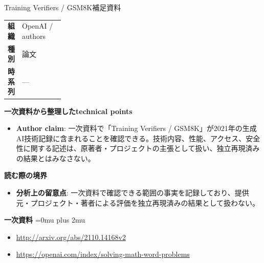 \begin{technicalnote}{Training Verifiers / GSM8K}{補足資料}
\begingroup
\begin{tabularx}{\linewidth}{@{}>{\bfseries}p{0.22\linewidth}X@{}}
組織 & OpenAI / authors \\
種別 & 論文 \\
時系列 & — \\
\end{tabularx}
\smallskip
{\bfseries 一次資料から整理したtechnical points}
\begin{itemize}[leftmargin=1.5em,itemsep=0.35em]
\item \textbf{Author claim}: 一次資料で「Training Verifiers / GSM8K」が2021年の生成AI技術記録に含まれることを確認できる。技術内容、性能、アクセス、安全性に関する記述は、原著者・プロジェクトの主張として扱い、独立再現済みの結果とはみなさない。
\end{itemize}
\begin{minipage}{\linewidth}
{\bfseries 読む際の境界}
\begin{itemize}[leftmargin=1.5em,itemsep=0.35em]
\item \textbf{分析上の留意点}: 一次資料で確認できる範囲の事実を記録しており、提供元・プロジェクト・著者による評価を独立再現済みの結果として扱わない。
\end{itemize}
\begin{samepage}
{\bfseries 一次資料}
\begingroup\sloppy
\Urlmuskip=0mu plus 2mu\relax
\begin{itemize}[leftmargin=1.5em,itemsep=0.25em]
\item {\scriptsize\url{http://arxiv.org/abs/2110.14168v2}}
\item {\scriptsize\url{https://openai.com/index/solving-math-word-problems}}
\end{itemize}
\endgroup
\end{samepage}
\end{minipage}
\endgroup
\end{technicalnote}
\medskip
